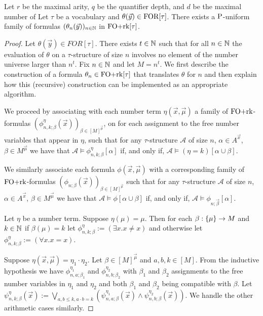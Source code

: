 \documentclass[../main/thesis.tex]{subfiles}
\begin{document}
\begin{lem}
  Let $r$ be the maximal arity, $q$ be the quantifier depth, and $d$ be the
  maximal number of 
  Let $\tau$ be a vocabulary and $\theta(\vec{y}) \in \text{\upshape FOR}[\tau]$. There exists
  a $\mathrm{P}$-uniform family of formulas $(\theta_n(\vec{y}))_{n \in \mathbb{N}}$ in
  $\text{\upshape FO+rk}[\tau]$.
\end{lem}
\begin{proof}
  Let $\theta(\vec{y}) \in FOR[\tau]$. There exists $t \in \mathbb{N}$ such that for
  all $n \in \mathbb{N}$ the evaluation of $\theta$ on a $\tau$-structure of size $n$
  involves no element of the number universe larger than $n^t$. Fix $n \in
  \mathbb{N}$ and let $M = n^t$. We first describe the construction of a formula
  $\theta_n \in \text{\upshape FO+rk}[\tau]$ that translates $\theta$ for $n$ and then explain
  how this (recursive) construction can be implemented as an appropriate
  algorithm.
  
  We proceed by associating with each number term $\eta (\vec{x}, \vec{\mu})$ a
  family of $\text{\upshape FO+rk}$-formulas $(\phi^{\eta}_{n, k; \beta}(\vec{x}))_{\beta \in
    [M]^{\vec{\mu}}}$, on for each assignment to the free number variables that
  appear in $\eta$, such that for any $\tau$-structure $\mathcal{A}$ of size
  $n$, $\alpha \in A^{\vec{x}}$, $\beta \in M^{\vec{\mu}}$ we have that
  $\mathcal{A} \models \phi^{\eta}_{n, k; \beta} [\alpha]$ if, and only if,
  $\mathcal{A} \models (\eta = k)[\alpha \cup \beta]$.

  We similarly associate each formula $\phi(\vec{x}, \vec{\mu})$ with a
  corresponding family of $\text{\upshape FO+rk}$-formulas $(\phi_{n; \beta} (\vec{x}))_{\beta
    \in [M]^{\vec{\mu}}}$ such that for any $\tau$-structure $\mathcal{A}$ of
  size $n$, $\alpha \in A^{\vec{x}}$, $\beta \in M^{\vec{\mu}}$ we have that
  $\mathcal{A} \models \phi[\alpha \cup \beta]$ if, and only if, $\mathcal{A}
  \models \phi_{n; \vec{\beta}}[\alpha]$.

  Let $\eta$ be a number term. Suppose $\eta (\mu) = \mu$. Then for each $\beta:
  \{\mu\} \rightarrow M$ and $k \in \mathbb{N}$ if $\beta(\mu) = k$ let $\phi^{\eta}_{n, k ;
    \beta} := (\exists x . x \neq x)$ and otherwise let $\phi^{\eta}_{n, k;
    \beta} := (\forall x. x = x)$.

  Suppose $\eta(\vec{x}, \vec{\mu}) = \eta_1 \cdot \eta_2$. Let $\beta \in
  [M]^{\vec{\mu}}$ and $a, b, k \in [M]$. From the inductive hypothesis we have
  $\phi^{\eta_1}_{n, a; \beta_1}$ and $\phi^{\eta_2}_{n, b; \beta_2}$ with
  $\beta_1$ and $\beta_2$ assignments to the free number variables in $\eta_1$
  and $\eta_2$ and both $\beta_1$ and $\beta_2$ being compatible with $\beta$.
  Let $\psi^{\eta}_{n,k ; \beta} (\vec{x}) := \underset{a, b \leq k, a \cdot b =
    k}{\bigvee} (\psi^{\eta_1}_{n, a ;\beta}(\vec{x}) \land \psi^{\eta_2}_{n, b;
    \beta}(\vec{x}))$. We handle the other arithmetic cases similarly.



\end{proof}
\end{document}
